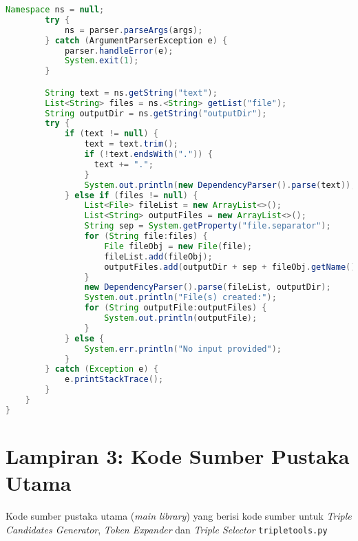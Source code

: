 \begin{lstlisting}[language=Java]
        Namespace ns = null;
        try {
            ns = parser.parseArgs(args);
        } catch (ArgumentParserException e) {
            parser.handleError(e);
            System.exit(1);
        }

        String text = ns.getString("text");
        List<String> files = ns.<String> getList("file");
        String outputDir = ns.getString("outputDir");
        try {
            if (text != null) {
                text = text.trim();
                if (!text.endsWith(".")) {
                  text += ".";
                }
                System.out.println(new DependencyParser().parse(text));
            } else if (files != null) {
                List<File> fileList = new ArrayList<>();
                List<String> outputFiles = new ArrayList<>();
                String sep = System.getProperty("file.separator");
                for (String file:files) {
                    File fileObj = new File(file);
                    fileList.add(fileObj);
                    outputFiles.add(outputDir + sep + fileObj.getName() + "." + OUTPUT_FORMAT);
                }
                new DependencyParser().parse(fileList, outputDir);
                System.out.println("File(s) created:");
                for (String outputFile:outputFiles) {
                    System.out.println(outputFile);
                }
            } else {
                System.err.println("No input provided");
            }
        } catch (Exception e) {
            e.printStackTrace();
        }
    }
}

\end{lstlisting}



\chapter*{Lampiran 3: Kode Sumber Pustaka Utama}

Kode sumber pustaka utama (\textit{main library}) yang berisi kode sumber untuk \textit{Triple Candidates Generator}, \textit{Token Expander} dan \textit{Triple Selector} \verb|tripletools.py|


